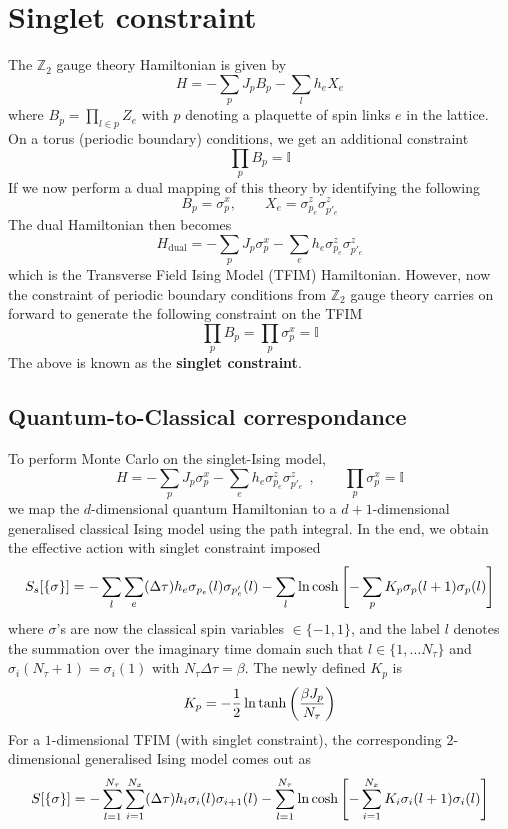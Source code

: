 \documentclass[../journal_main.tex]{subfiles}
\begin{document}
\chapter{Singlet constraint}
The $\mathbb{Z}_2$ gauge theory Hamiltonian is given by 
\begin{equation}
    H = - \sum_{p} J_p B_p - \sum_{l} h_e {X}_e
\end{equation}
where $B_p = \prod_{l \in p} {Z}_e$ with $p$ denoting a plaquette of spin links $e$ in the lattice. On a torus (periodic boundary) conditions, we get an additional constraint 
\begin{equation*}
    \prod_{p} {B}_p = \mathbb{I}
\end{equation*}
If we now perform a dual mapping of this theory by identifying the following
\[
    B_p = \sigma^x_p, \qquad X_e = \sigma^z_{p_e} \sigma^z_{p'_e}
\]
The dual Hamiltonian then becomes 
\begin{equation}
    H_\text{dual} = - \sum_p J_p \sigma^x_p - \sum_e h_e \sigma^z_{p_e} \sigma^z_{p'_e}
\end{equation}
which is the Transverse Field Ising Model (TFIM) Hamiltonian. However, now the constraint of periodic boundary conditions from $\mathbb{Z}_2$ gauge theory carries on forward to generate the following constraint on the TFIM
\[
    \prod_p B_p = \boxed{\prod_p \sigma^x_p = \mathbb{I}}
\]
The above is known as the \textbf{singlet constraint}.

\section{Quantum-to-Classical correspondance}
To perform Monte Carlo on the singlet-Ising model, 
\begin{equation}
    H = - \sum_p J_p \sigma^x_p - \sum_e h_e \sigma^z_{p_e} \sigma^z_{p'_e}\:\:, \qquad \prod_p \sigma^x_p = \mathbb{I}
    \label{Htfim}
\end{equation}  
we map the $d$-dimensional quantum Hamiltonian to a $d+1$-dimensional generalised classical Ising model using the path integral. In the end, we obtain the effective action with singlet constraint imposed
\begin{equation}
    S_s[\{\sigma\}] = -\sum_{l}\sum_{e} (\Delta \tau) h_e \sigma_{p_e}(l) \sigma_{p'_e}(l) - \sum_l \ln \cosh \qty[- \sum_p K_p \sigma_p(l+1) \sigma_p(l)] 
\end{equation}
where $\sigma$'s are now the classical spin variables $\in \{-1,1\}$, and the label $l$ denotes the summation over the imaginary time domain such that $l \in \{1, \ldots N_\tau\}$ and $\sigma_i(N_\tau +1) = \sigma_i(1)$ with $N_\tau \Delta \tau = \beta$. The newly defined $K_p$ is  
\[
    K_p = -\frac{1}{2} \ln \tanh\qty(\frac{\beta J_p}{N_\tau})  
\]
For a $1$-dimensional TFIM (with singlet constraint), the corresponding $2$-dimensional generalised Ising model comes out as
\begin{equation}
    S[\{\sigma\}] = -\sum_{l=1}^{N_\tau}\sum_{i=1}^{N_x} (\Delta \tau) h_i \sigma_{i}(l) \sigma_{i+1}(l) - \sum_{l=1}^{N_\tau} \ln \cosh \qty[- \sum_{i=1}^{N_x} K_i \sigma_i(l+1) \sigma_i(l)]
    \label{1Dtfimto2Dcim}
\end{equation}  
\end{document}
